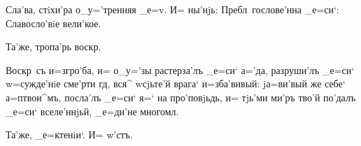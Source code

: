 Сла'ва, стiхи'ра о_у='тренняя _е=v. И= ны'нjь: 
Пребл~гослове'нна _е=си`: Славосло'вiе вели'кое. 

Та'же, тропа'рь воскр.

Воскр~съ и=з\ъ гро'ба, и= о_у='зы растерза'лъ _е=си` 
а='да, разруши'лъ _е=си` w=сужде'нiе сме'рти гд, вся^ 
w\т сjьте'й врага` и=зба'вивый: jа=ви'вый же себе` 
а=п твои^мъ, посла'лъ _е=си` я=` на про'повjьдь, и= 
тjь'ми ми'ръ тво'й по'далъ _е=си` вселе'ннjьй, _е=ди'не 
многомл.

Та'же, _е=ктенiи`. И= w'стъ. 
